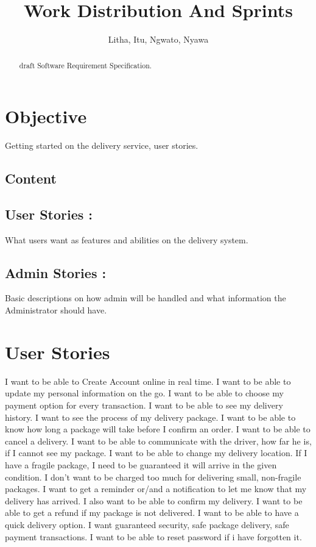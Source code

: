 \documentclass[a4paper]{article}
\title{Work Distribution And Sprints}
\author{Litha, Itu, Ngwato, Nyawa}
\begin{document}
\maketitle

\begin{abstract}
\centering draft Software Requirement Specification.
\end{abstract}

\section{Objective}

Getting started on the delivery service, user stories.

\subsection{Content}

\subsection*{User Stories :} What users want as features and abilities on the delivery system.

\subsection*{Admin Stories :} Basic descriptions on how admin will be handled and what
information the Administrator should have.

\section{User Stories}
I want to be able to Create Account online in real time. I want to be
able to update my personal information on the go. I want to be able to
choose my payment option for every transaction. I want to be able to see
my delivery history. I want to see the process of my delivery package. I
want to be able to know how long a package will take before I confirm
an order. I want to be able to cancel a delivery. I want to be able to
communicate with the driver, how far he is, if I cannot see my package. I
want to be able to change my delivery location. If I have a fragile package,
I need to be guaranteed it will arrive in the given condition. I don't want to
be charged too much for delivering small, non-fragile packages. I want to
get a reminder or/and a notification to let me know that my delivery has
arrived. I also want to be able to confirm my delivery. I want to be able
to get a refund if my package is not delivered. I want to be able to have
a quick delivery option. I want guaranteed security, safe package delivery,
safe payment transactions. I want to be able to reset password if i have
forgotten it.
\end{document}
